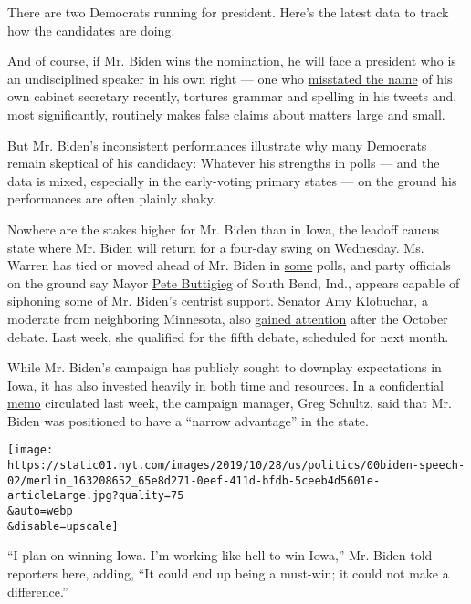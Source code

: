 There are two Democrats running for president. Here's the latest data to
track how the candidates are doing.

And of course, if Mr. Biden wins the nomination, he will face a
president who is an undisciplined speaker in his own right --- one who
\href{https://www.nytimes.com/2019/10/20/us/politics/mark-esperanto-trump-tweet.html}{misstated
the name} of his own cabinet secretary recently, tortures grammar and
spelling in his tweets and, most significantly, routinely makes false
claims about matters large and small.

But Mr. Biden's inconsistent performances illustrate why many Democrats
remain skeptical of his candidacy: Whatever his strengths in polls ---
and the data is mixed, especially in the early-voting primary states ---
on the ground his performances are often plainly shaky.

Nowhere are the stakes higher for Mr. Biden than in Iowa, the leadoff
caucus state where Mr. Biden will return for a four-day swing on
Wednesday. Ms. Warren has tied or moved ahead of Mr. Biden in
\href{https://www.realclearpolitics.com/epolls/2020/president/ia/iowa_democratic_presidential_caucus-6731.html}{some}
polls, and party officials on the ground say Mayor
\href{https://www.nytimes.com/interactive/2020/us/elections/pete-buttigieg.html}{Pete
Buttigieg} of South Bend, Ind., appears capable of siphoning some of Mr.
Biden's centrist support. Senator
\href{https://www.nytimes.com/interactive/2020/us/elections/amy-klobuchar.html}{Amy
Klobuchar}, a moderate from neighboring Minnesota, also
\href{https://www.nytimes.com/2019/10/21/us/politics/amy-klobuchar-iowa.html}{gained
attention} after the October debate. Last week, she qualified for the
fifth debate, scheduled for next month.

While Mr. Biden's campaign has publicly sought to downplay expectations
in Iowa, it has also invested heavily in both time and resources. In a
confidential
\href{https://www.nytimes.com/2019/10/26/us/politics/joe-biden-campaign-fundraising.html}{memo}
circulated last week, the campaign manager, Greg Schultz, said that Mr.
Biden was positioned to have a ``narrow advantage'' in the state.

\texttt{[image: https://static01.nyt.com/images/2019/10/28/us/politics/00biden-speech-02/merlin\_163208652\_65e8d271-0eef-411d-bfdb-5ceeb4d5601e-articleLarge.jpg?quality=75\\\&auto=webp\\\&disable=upscale]}

``I plan on winning Iowa. I'm working like hell to win Iowa,'' Mr. Biden
told reporters here, adding, ``It could end up being a must-win; it
could not make a difference.''

